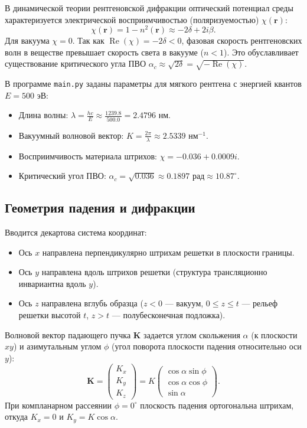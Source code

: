 \documentclass[a4paper,11pt]{article}
\begin{document}
В динамической теории рентгеновской дифракции оптический потенциал среды характеризуется электрической восприимчивостью (поляризуемостью) $\chi(\mathbf{r})$:
\begin{equation}
\chi(\mathbf{r}) = 1 - n^2(\mathbf{r}) \approx -2\delta + 2i\beta.
\end{equation}
Для вакуума $\chi = 0$. Так как $\operatorname{Re}(\chi) = -2\delta < 0$, фазовая скорость рентгеновских волн в веществе превышает скорость света в вакууме ($n < 1$). Это обуславливает существование критического угла ПВО $\alpha_c \approx \sqrt{2\delta} = \sqrt{-\operatorname{Re}(\chi)}$.

В программе \texttt{main.py} заданы параметры для мягкого рентгена с энергией квантов $E = 500\text{ эВ}$:
\begin{itemize}
    \item Длина волны: $\lambda = \frac{hc}{E} \approx \frac{1239.8}{500.0} = 2.4796\text{ нм}$.
    \item Вакуумный волновой вектор: $K = \frac{2\pi}{\lambda} \approx 2.5339\text{ нм}^{-1}$.
    \item Восприимчивость материала штрихов: $\chi = -0.036 + 0.0009i$.
    \item Критический угол ПВО: $\alpha_c = \sqrt{0.036} \approx 0.1897\text{ рад} \approx 10.87^\circ$.
\end{itemize}

\subsection{Геометрия падения и дифракции}
Вводится декартова система координат:
\begin{itemize}
    \item Ось $x$ направлена перпендикулярно штрихам решетки в плоскости границы.
    \item Ось $y$ направлена вдоль штрихов решетки (структура трансляционно инвариантна вдоль $y$).
    \item Ось $z$ направлена вглубь образца ($z < 0$ --- вакуум, $0 \le z \le t$ --- рельеф решетки высотой $t$, $z > t$ --- полубесконечная подложка).
\end{itemize}

Волновой вектор падающего пучка $\mathbf{K}$ задается углом скольжения $\alpha$ (к плоскости $xy$) и азимутальным углом $\phi$ (угол поворота плоскости падения относительно оси $y$):
\begin{equation}
\mathbf{K} = \begin{pmatrix} K_x \\ K_y \\ K_z \end{pmatrix} = K \begin{pmatrix} \cos\alpha \sin\phi \\ \cos\alpha \cos\phi \\ \sin\alpha \end{pmatrix}.
\end{equation}
При компланарном рассеянии $\phi = 0^\circ$ плоскость падения ортогональна штрихам, откуда $K_x = 0$ и $K_y = K\cos\alpha$.
\end{document}

